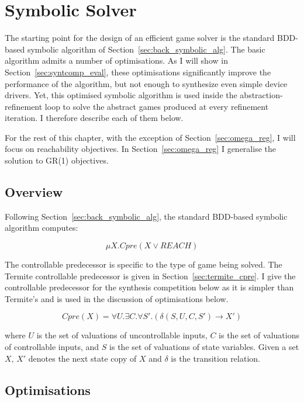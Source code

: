 \section{Symbolic Solver}
\label{sec:syntcomp}

The starting point for the design of an efficient game solver is the standard BDD-based symbolic algorithm of Section~\ref{sec:back_symbolic_alg}. The basic algorithm admits a number of optimisations. As I will show in Section~\ref{sec:syntcomp_eval}, these optimisations significantly improve the performance of the algorithm, but not enough to synthesize even simple device drivers. Yet, this optimised symbolic algorithm is used inside the abstraction-refinement loop to solve the abstract games produced at every refinement iteration. I therefore describe each of them below.

For the rest of this chapter, with the exception of Section~\ref{sec:omega_reg}, I will focus on reachability objectives. In Section~\ref{sec:omega_reg} I generalise the solution to GR(1) objectives. 

\subsection{Overview}
Following Section~\ref{sec:back_symbolic_alg}, the standard BDD-based symbolic algorithm computes:

\begin{equation}
\label{eqn:mu_syntcomp}
\mu X. Cpre(X \lor REACH)
\end{equation}

The controllable predecessor is specific to the type of game being solved. The Termite controllable predecessor is given in Section~\ref{sec:termite_cpre}. I give the controllable predecessor for the synthesis competition below as it is simpler than Termite's and is used in the discussion of optimisations below.

\begin{equation}
\label{eqn:cpre_syntcomp}
Cpre(X) = \forall U. \exists C. \forall S'. (\delta(S, U, C, S') \rightarrow X')
\end{equation}

\noindent where $U$ is the set of valuations of uncontrollable inputs, $C$ is the set of valuations of controllable inputs, and $S$ is the set of valuations of state variables. Given a set $X$, $X'$ denotes the next state copy of $X$ and $\delta$ is the transition relation.

\subsection{Optimisations}
\label{sec:syntcomp_optimisations}

